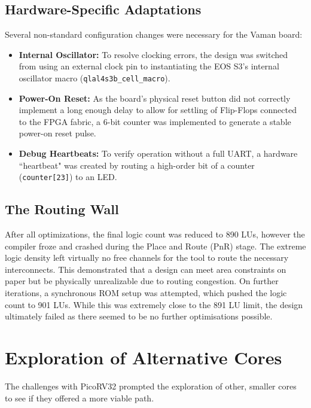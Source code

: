 \documentclass[conference]{IEEEtran}
\begin{document}
\subsection{Hardware-Specific Adaptations}
Several non-standard configuration changes were necessary for the Vaman board:
\begin{itemize}
    \item \textbf{Internal Oscillator:} To resolve clocking errors, the design was switched from using an external clock pin to instantiating the EOS S3's internal oscillator macro (\verb|qlal4s3b_cell_macro|).
    \item \textbf{Power-On Reset:} As the board's physical reset button did not correctly implement a long enough delay to allow for settling of Flip-Flops connected to the FPGA fabric, a 6-bit counter was implemented to generate a stable power-on reset pulse.
    \item \textbf{Debug Heartbeats:} To verify operation without a full UART, a hardware ``heartbeat" was created by routing a high-order bit of a counter (\verb|counter[23]|) to an LED.
\end{itemize}

\subsection{The Routing Wall}
After all optimizations, the final logic count was reduced to 890 LUs, however the compiler froze and crashed during the Place and Route (PnR) stage. The extreme logic density left virtually no free channels for the tool to route the necessary interconnects. This demonstrated that a design can meet area constraints on paper but be physically unrealizable due to routing congestion. On further iterations, a synchronous ROM setup was attempted, which pushed the logic count to 901 LUs. While this was extremely close to the 891 LU limit, the design ultimately failed as there seemed to be no further optimisations possible.

\section{Exploration of Alternative Cores}
The challenges with PicoRV32 prompted the exploration of other, smaller cores to see if they offered a more viable path.
\end{document}
